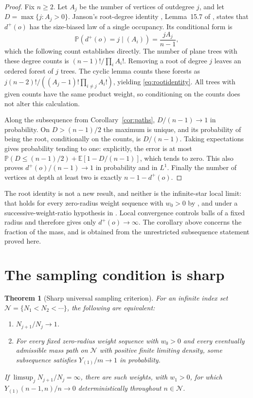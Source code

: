 \documentclass[11pt]{amsart}
\newtheorem{theorem}{Theorem}[section]
\theoremstyle{remark}\newtheorem{remark}[theorem]{Remark}
\newcommand{\Pp}{\mathbb P}
\newcommand{\E}{\mathbb E}
\begin{document}
\begin{proof}
Fix $n\ge2$. Let $A_j$ be the number of vertices of outdegree $j$, and let
$D=\max\{j:A_j>0\}$. Janson's root-degree identity
\cite[Lemma~14.7]{JansonPreprint}, Lemma~15.7 of \cite{Janson}, states that
$d^+(o)$ has the size-biased law of a single occupancy. Its conditional form is
\begin{equation}\label{eq:rootidentity}
 \Pp(d^+(o)=j\mid(A_i))=\frac{jA_j}{n-1},
\end{equation}
which the following count establishes directly. The number of plane trees with
these degree counts is
$(n-1)!/\prod_iA_i!$. Removing a root of degree $j$ leaves an ordered forest
of $j$ trees. The cyclic lemma counts these forests as
$j(n-2)!/((A_j-1)!\prod_{i\ne j}A_i!)$, yielding
\eqref{eq:rootidentity}. All trees with given counts have the same product
weight, so conditioning on the counts does not alter this calculation.

Along the subsequence from Corollary~\ref{cor:paths}, $D/(n-1)\to1$ in
probability. On $D>(n-1)/2$ the maximum is unique, and its probability of
being the root, conditionally on the counts, is $D/(n-1)$. Taking
expectations gives probability tending to one: explicitly, the error is
at most
$\Pp(D\le(n-1)/2)+\E[1-D/(n-1)]$, which tends to zero. This also proves
$d^+(o)/(n-1)\to1$ in probability and in $L^1$. Finally the number of
vertices at depth at least two is exactly $n-1-d^+(o)$.
\end{proof}

The root identity is not a new result, and neither is the infinite-star local
limit: that holds for every zero-radius weight sequence with $w_0>0$ by
\cite[Theorem~7.1]{Janson}, and under a successive-weight-ratio hypothesis in
\cite{JJS}. Local convergence controls balls of a fixed radius and therefore
gives only $d^+(o)\to\infty$. The corollary above concerns the fraction of the
mass, and is obtained from the unrestricted subsequence statement proved
here.

\section{The sampling condition is sharp}\label{sec:sharp}
\begin{theorem}[Sharp universal sampling criterion]\label{thm:sampling}
For an infinite index set $\mathcal N=\{N_1<N_2<\cdots\}$, the following
are equivalent:
\begin{enumerate}[label=(\roman*)]
\item $N_{j+1}/N_j\to1$.
\item For every fixed zero-radius weight sequence with $w_0>0$ and every
      eventually admissible mass path on $\mathcal N$ with positive finite
      limiting density, some subsequence satisfies $Y_{(1)}/m\to1$ in
      probability.
\end{enumerate}
If $\limsup_jN_{j+1}/N_j=\infty$, there are such weights, with $w_1>0$, for
which $Y_{(1)}(n-1,n)/n\to0$ deterministically throughout $n\in\mathcal N$.
\end{theorem}
\end{document}
